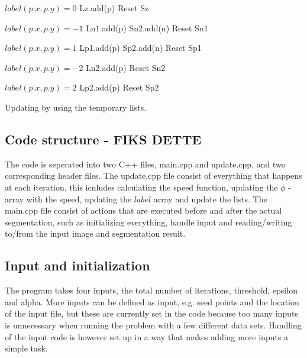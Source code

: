 \begin{algorithm}[h!]
\begin{algorithmic}[1]
		\State $label(p.x, p.y) = 0$
		\State Lz.add(p)
	\EndFor
	\State Reset Sz
	
		\State $label(p.x, p.y) = -1$
		\State Ln1.add(p)
				\State Sn2.add(n)
			\EndIf
		\EndFor
	\EndFor
	\State Reset Sn1
	
		\State $label(p.x, p.y) = 1$
		\State Lp1.add(p)
				\State Sp2.add(n)
			\EndIf
		\EndFor
	\EndFor
	\State Reset Sp1
	
		\State $label(p.x, p.y) = -2$
		\State Ln2.add(p)
	\EndFor
	\State Reset Sn2
	
		\State $label(p.x, p.y) = 2$
		\State Lp2.add(p)
	\EndFor
	\State Reset Sp2
\end{algorithmic}
\caption{Updating by using the temporary lists.}
\label{updateLevelSets}
\end{algorithm}
\clearpage

\subsection{Code structure - FIKS DETTE}
The code is seperated into two C++ files, main.cpp and update.cpp, and two corresponding header files. The update.cpp file consist of everything that happens at each iteration, this icnludes calculating the speed function, updating the $\phi$ - array with the speed, updating the $label$ array and update the lists. The main.cpp file consist of actions that are executed before and after the actual segmentation, such as initializing everything, handle input and reading/writing to/from the input image and segmentation result. 

\subsection{Input and initialization}
The program takes four inputs, the total number of iterations, threshold, epsilon and alpha. More inputs can be defined as input, e.g. seed points and the location of the input file, but these are currently set in the code because too many inputs is unnecessary when running the problem with a few different data sets. Handling of the input code is however set up in a way that makes adding more inputs a simple task. 

